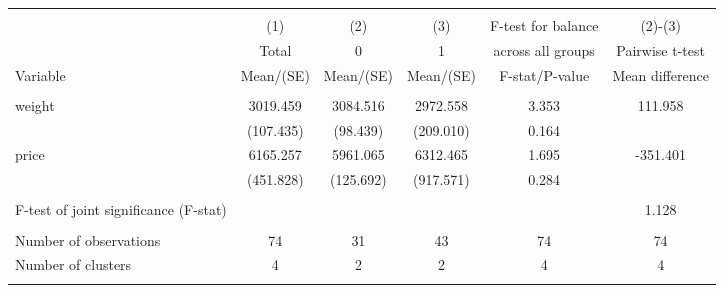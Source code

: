 
\begin{tabular}{@{\extracolsep{5pt}}lccccc}
\\[-1.8ex]\hline \hline \\[-1.8ex]
 & \multicolumn{1}{c}{(1)}  & \multicolumn{1}{c}{(2)}  & \multicolumn{1}{c}{(3)}  & \multicolumn{1}{c}{F-test for balance} & \multicolumn{1}{c}{(2)-(3)} \\
 & \multicolumn{1}{c}{Total}  & \multicolumn{1}{c}{0}  & \multicolumn{1}{c}{1}  & \multicolumn{1}{c}{across all groups} & \multicolumn{1}{c}{Pairwise t-test}  \\
Variable & Mean/(SE) & Mean/(SE) & Mean/(SE) & F-stat/P-value & Mean difference \\ \hline \\[-1.8ex] 
weight   & 3019.459    & 3084.516    & 2972.558    & 3.353    & 111.958   \\
 & (107.435)  & (98.439)  & (209.010)  & 0.164  &  \\ [1ex]
price   & 6165.257    & 5961.065    & 6312.465    & 1.695    & -351.401   \\
 & (451.828)  & (125.692)  & (917.571)  & 0.284  &  \\ [1ex]
\hline \\[-1.8ex]
F-test of joint significance (F-stat) &   &   &   &     &  1.128  \\
\hline \\[-1.8ex]
Number of observations  & 74   & 31   & 43  & 74 & 74  \\
Number of clusters & 4  & 2  & 2  & 4 & 4  \\
\hline \hline \\[-1.8ex]

\end{tabular}
